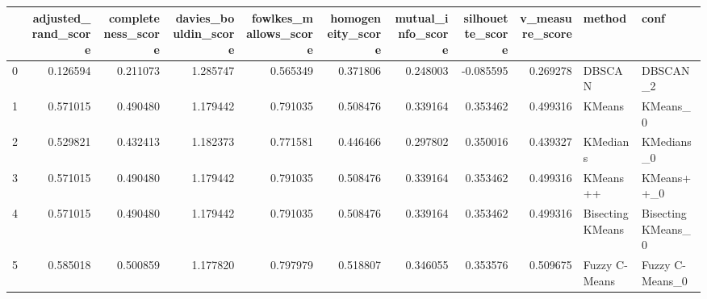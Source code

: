 \begin{tabular}{lrrrrrrrrll}
\toprule
{} &  adjusted\_rand\_score &  completeness\_score &  davies\_bouldin\_score &  fowlkes\_mallows\_score &  homogeneity\_score &  mutual\_info\_score &  silhouette\_score &  v\_measure\_score &            method &                conf \\
\midrule
0 &             0.126594 &            0.211073 &              1.285747 &               0.565349 &           0.371806 &           0.248003 &         -0.085595 &         0.269278 &            DBSCAN &            DBSCAN\_2 \\
1 &             0.571015 &            0.490480 &              1.179442 &               0.791035 &           0.508476 &           0.339164 &          0.353462 &         0.499316 &            KMeans &            KMeans\_0 \\
2 &             0.529821 &            0.432413 &              1.182373 &               0.771581 &           0.446466 &           0.297802 &          0.350016 &         0.439327 &          KMedians &          KMedians\_0 \\
3 &             0.571015 &            0.490480 &              1.179442 &               0.791035 &           0.508476 &           0.339164 &          0.353462 &         0.499316 &          KMeans++ &          KMeans++\_0 \\
4 &             0.571015 &            0.490480 &              1.179442 &               0.791035 &           0.508476 &           0.339164 &          0.353462 &         0.499316 &  Bisecting KMeans &  Bisecting KMeans\_0 \\
5 &             0.585018 &            0.500859 &              1.177820 &               0.797979 &           0.518807 &           0.346055 &          0.353576 &         0.509675 &     Fuzzy C-Means &     Fuzzy C-Means\_0 \\
\bottomrule
\end{tabular}
